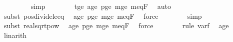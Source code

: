 \begin{isabellebody}
\ \ \ \ \ \ \ \isamarkupfalse%
\ simp\isanewline
\ \ \ \ \ \ \isamarkupfalse%
\ t{\isacharunderscore}{\kern0pt}ge{\isacharunderscore}{\kern0pt}{}\ a{\isacharunderscore}{\kern0pt}ge{\isacharunderscore}{\kern0pt}{}\ p{\isacharunderscore}{\kern0pt}ge{\isacharunderscore}{\kern0pt}{}\ m{\isacharunderscore}{\kern0pt}ge{\isacharunderscore}{\kern0pt}{}\ m{\isacharunderscore}{\kern0pt}eq{\isacharunderscore}{\kern0pt}F{\isacharunderscore}{\kern0pt}{}\ \isamarkupfalse%
\ auto\isanewline
\ \ \ \ \isamarkupfalse%
\ \isamarkupfalse%
\ {\isachardoublequoteopen}{\isachardot}{\kern0pt}{\isachardot}{\kern0pt}{\isachardot}{\kern0pt}\ {\isasymle}\ {}{\isacharslash}{\kern0pt}{}{\isachardoublequoteclose}\isanewline
\ \ \ \ \ \ \isamarkupfalse%
\ {\isacharparenleft}{\kern0pt}subst\ pos{\isacharunderscore}{\kern0pt}divide{\isacharunderscore}{\kern0pt}le{\isacharunderscore}{\kern0pt}eq{\isacharparenright}{\kern0pt}\ \isamarkupfalse%
\ a{\isacharunderscore}{\kern0pt}ge{\isacharunderscore}{\kern0pt}{}\ p{\isacharunderscore}{\kern0pt}ge{\isacharunderscore}{\kern0pt}{}\ m{\isacharunderscore}{\kern0pt}ge{\isacharunderscore}{\kern0pt}{}\ m{\isacharunderscore}{\kern0pt}eq{\isacharunderscore}{\kern0pt}F{\isacharunderscore}{\kern0pt}{}\ \isamarkupfalse%
\ force\isanewline
\ \ \ \ \ \ \isamarkupfalse%
\ simp\isanewline
\ \ \ \ \ \ \isamarkupfalse%
\ {\isacharparenleft}{\kern0pt}subst\ real{\isacharunderscore}{\kern0pt}sqrt{\isacharunderscore}{\kern0pt}pow{}{\isacharparenright}{\kern0pt}\ \isamarkupfalse%
\ a{\isacharunderscore}{\kern0pt}ge{\isacharunderscore}{\kern0pt}{}\ p{\isacharunderscore}{\kern0pt}ge{\isacharunderscore}{\kern0pt}{}\ m{\isacharunderscore}{\kern0pt}ge{\isacharunderscore}{\kern0pt}{}\ m{\isacharunderscore}{\kern0pt}eq{\isacharunderscore}{\kern0pt}F{\isacharunderscore}{\kern0pt}{}\ \isamarkupfalse%
\ force\isanewline
\ \ \ \ \ \ \isamarkupfalse%
\ {\isacharparenleft}{\kern0pt}rule\ var{\isacharunderscore}{\kern0pt}f{\isacharparenright}{\kern0pt}\ \isamarkupfalse%
\ a{\isacharunderscore}{\kern0pt}ge{\isacharunderscore}{\kern0pt}{}\ \isamarkupfalse%
\ linarith\isanewline
\ \ \ \ \ \ \isamarkupfalse%

\end{isabellebody}

